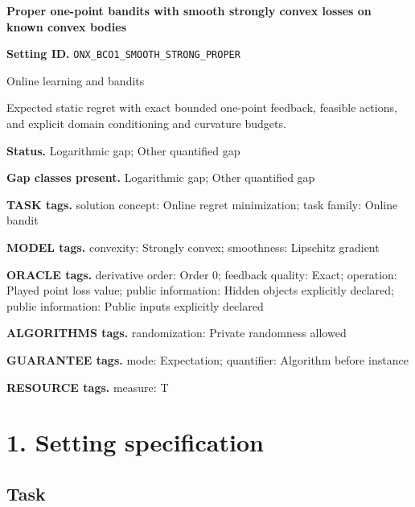 \documentclass[10pt,a4paper]{article}
\begin{document}
\raggedright

{\LARGE\bfseries\sffamily\color{AtlasNavy} Proper one-point bandits with smooth strongly convex losses on known convex bodies\par}\vspace{5pt}


\textbf{Setting ID.} \texttt{ONX\_\allowbreak{}BCO1\_\allowbreak{}SMOOTH\_\allowbreak{}STRONG\_\allowbreak{}PROPER}



Online learning and bandits



Expected static regret with exact bounded one-point feedback, feasible actions, and explicit domain conditioning and curvature budgets.



\textbf{Status.} Logarithmic gap; Other quantified gap



\textbf{Gap classes present.} Logarithmic gap; Other quantified gap



\textbf{TASK tags.} solution concept: Online regret minimization; task family: Online bandit



\textbf{MODEL tags.} convexity: Strongly convex; smoothness: Lipschitz gradient



\textbf{ORACLE tags.} derivative order: Order 0; feedback quality: Exact; operation: Played point loss value; public information: Hidden objects explicitly declared; public information: Public inputs explicitly declared



\textbf{ALGORITHMS tags.} randomization: Private randomness allowed



\textbf{GUARANTEE tags.} mode: Expectation; quantifier: Algorithm before instance



\textbf{RESOURCE tags.} measure: T



\section{1. Setting specification}


\subsection{Task}
\end{document}
